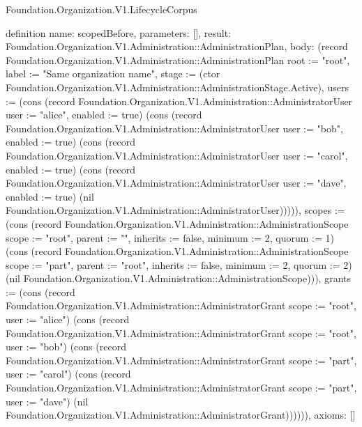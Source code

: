 \begin{lexlean}{Foundation.Organization.V1.LifecycleCorpus}
\begin{semanticmodule}
definition{
  name: scopedBefore,
  parameters: [],
  result: Foundation.Organization.V1.Administration::AdministrationPlan,
  body: (record Foundation.Organization.V1.Administration::AdministrationPlan {root := "root", label := "Same organization name", stage := (ctor Foundation.Organization.V1.Administration::AdministrationStage.Active), users := (cons (record Foundation.Organization.V1.Administration::AdministratorUser {user := "alice", enabled := true}) (cons (record Foundation.Organization.V1.Administration::AdministratorUser {user := "bob", enabled := true}) (cons (record Foundation.Organization.V1.Administration::AdministratorUser {user := "carol", enabled := true}) (cons (record Foundation.Organization.V1.Administration::AdministratorUser {user := "dave", enabled := true}) (nil Foundation.Organization.V1.Administration::AdministratorUser))))), scopes := (cons (record Foundation.Organization.V1.Administration::AdministrationScope {scope := "root", parent := "", inherits := false, minimum := 2, quorum := 1}) (cons (record Foundation.Organization.V1.Administration::AdministrationScope {scope := "part", parent := "root", inherits := false, minimum := 2, quorum := 2}) (nil Foundation.Organization.V1.Administration::AdministrationScope))), grants := (cons (record Foundation.Organization.V1.Administration::AdministratorGrant {scope := "root", user := "alice"}) (cons (record Foundation.Organization.V1.Administration::AdministratorGrant {scope := "root", user := "bob"}) (cons (record Foundation.Organization.V1.Administration::AdministratorGrant {scope := "part", user := "carol"}) (cons (record Foundation.Organization.V1.Administration::AdministratorGrant {scope := "part", user := "dave"}) (nil Foundation.Organization.V1.Administration::AdministratorGrant)))))}),
  axioms: []
}


\end{semanticmodule}
\end{lexlean}
